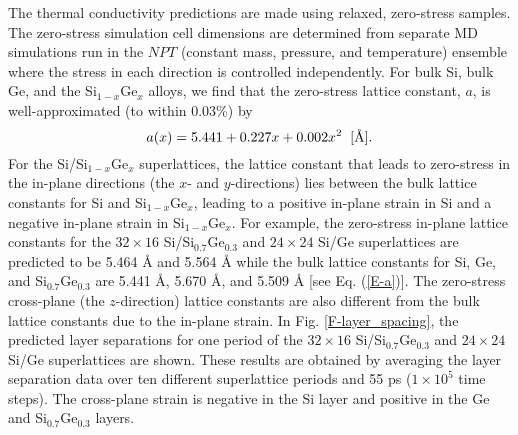 \documentclass[letterpaper,12pt]{article}
\begin{document}

The thermal conductivity predictions are made using relaxed,
zero-stress samples. The zero-stress simulation cell dimensions are
determined from separate MD simulations run in the $NPT$ (constant
mass, pressure, and temperature) ensemble where the stress in each
direction is controlled independently. For bulk Si, bulk Ge, and the
Si$_{1-x}$Ge$_x$ alloys, we find that the zero-stress lattice
constant, $a$, is well-approximated (to within 0.03\%) by
\begin{equation}
a(x) = 5.441 + 0.227x + 0.002x^2   \hspace{2mm} [\textrm{\AA}].
\label{E-a}
\end{equation}
For the Si/Si$_{1-x}$Ge$_x$ superlattices, the lattice constant that
leads to zero-stress in the in-plane directions (the $x$- and
$y$-directions) lies between the bulk lattice constants for Si and
Si$_{1-x}$Ge$_x$, leading to a positive in-plane strain in Si and a
negative in-plane strain in Si$_{1-x}$Ge$_x$. For example, the
zero-stress in-plane lattice constants for the $32\times16$
Si/Si$_{0.7}$Ge$_{0.3}$ and $24\times24$ Si/Ge superlattices are
predicted to be 5.464 \AA \hspace{1mm} and 5.564 \AA \hspace{1mm}
while the bulk lattice constants for Si, Ge, and
Si$_{0.7}$Ge$_{0.3}$ are 5.441 \AA, 5.670 \AA, and 5.509 \AA
\hspace{1mm} [see Eq. (\ref{E-a})]. The zero-stress cross-plane (the
$z$-direction) lattice constants are also different from the bulk
lattice constants due to the in-plane strain. In Fig$.$
\ref{F-layer_spacing}, the predicted layer separations for one
period of the $32\times16$ Si/Si$_{0.7}$Ge$_{0.3}$ and $24\times24$
Si/Ge superlattices are shown. These results are obtained by
averaging the layer separation data over ten different superlattice
periods and 55 ps ($1\times10^5$ time steps). The cross-plane strain
is negative in the Si layer and positive in the Ge and
Si$_{0.7}$Ge$_{0.3}$ layers.

\end{document}
